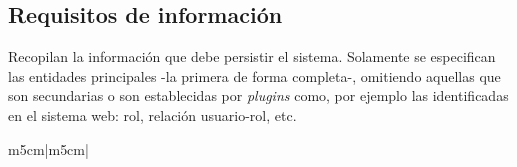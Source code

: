 \documentclass[12pt,a4paper, twoside]{report}
\begin{document}
	\subsection{Requisitos de información}
	
	Recopilan la información que debe persistir el sistema. Solamente se especifican las entidades principales -la primera de forma completa-, omitiendo aquellas que son secundarias o son establecidas por \textit{\glspl{plugin}} como, por ejemplo las identificadas en el sistema web: rol, relación usuario-rol, etc. \\
	 	
 	\newpage
 	
	\begin{longtable}{m{5cm}|m{5cm}|}
		\hline
		 \\ \hline
	

\end{longtable}
\end{document}
